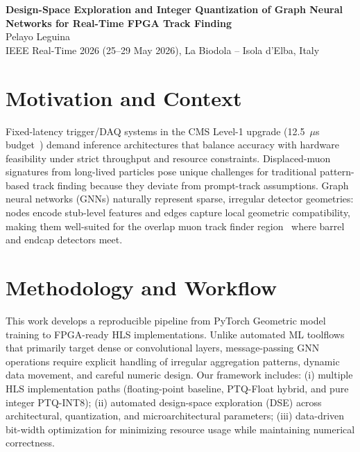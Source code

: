 \documentclass[10pt]{article}
\begin{document}
\begin{center}
{\Large \textbf{Design-Space Exploration and Integer Quantization of Graph Neural Networks for Real-Time FPGA Track Finding}}\\
\vspace{0.2em}
{Pelayo Leguina}\\
\vspace{0.2em}
{\small IEEE Real-Time 2026 (25--29 May 2026), La Biodola -- Isola d'Elba, Italy}
\end{center}

\vspace{-0.3em}
\section*{Motivation and Context}
Fixed-latency trigger/DAQ systems in the CMS Level-1 upgrade (12.5~$\mu$s budget~\cite{CMS_PHASE2_TDR}) demand inference architectures that balance accuracy with hardware feasibility under strict throughput and resource constraints. Displaced-muon signatures from long-lived particles pose unique challenges for traditional pattern-based track finding because they deviate from prompt-track assumptions. Graph neural networks (GNNs) naturally represent sparse, irregular detector geometries: nodes encode stub-level features and edges capture local geometric compatibility, making them well-suited for the overlap muon track finder region~\cite{OMTF_JINST} where barrel and endcap detectors meet.

\vspace{-0.2em}
\section*{Methodology and Workflow}
This work develops a reproducible pipeline from PyTorch Geometric model training to FPGA-ready HLS implementations. Unlike automated ML toolflows that primarily target dense or convolutional layers, message-passing GNN operations require explicit handling of irregular aggregation patterns, dynamic data movement, and careful numeric design. Our framework includes: (i) multiple HLS implementation paths (floating-point baseline, PTQ-Float hybrid, and pure integer PTQ-INT8); (ii) automated design-space exploration (DSE) across architectural, quantization, and microarchitectural parameters; (iii) data-driven bit-width optimization for minimizing resource usage while maintaining numerical correctness.

\vspace{-0.2em}
\end{document}
